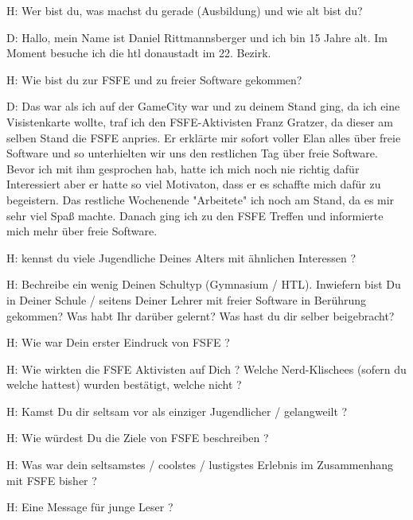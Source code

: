 H: Wer bist du, was machst du gerade (Ausbildung) und wie alt bist du?


D: Hallo, mein Name ist Daniel Rittmannsberger und ich bin 15 Jahre alt. Im Moment besuche ich die htl donaustadt im 22. Bezirk.





H: Wie bist du zur FSFE und zu freier Software gekommen?


D: Das war als ich auf der GameCity war und zu deinem Stand ging, da ich eine Visistenkarte wollte, traf ich den FSFE-Aktivisten
   Franz Gratzer, da dieser am selben Stand die FSFE anpries. Er erklärte mir sofort voller Elan alles über freie Software und so
   unterhielten wir uns den restlichen Tag über freie Software. Bevor ich mit ihm gesprochen hab, hatte ich mich noch nie
   richtig dafür Interessiert aber er hatte so viel Motivaton, dass er es schaffte mich dafür zu begeistern. Das restliche
   Wochenende "Arbeitete" ich noch am Stand, da es mir sehr viel Spaß machte. Danach ging ich zu den FSFE Treffen und
   informierte mich mehr über freie Software.





H: kennst du viele Jugendliche Deines Alters mit ähnlichen Interessen ?



H: Bechreibe ein wenig Deinen Schultyp (Gymnasium / HTL). Inwiefern bist Du in Deiner Schule / seitens Deiner Lehrer 
   mit freier Software in Berührung gekommen? Was habt Ihr darüber gelernt? Was hast du dir selber beigebracht?


H: Wie war Dein erster Eindruck von FSFE ?



H: Wie wirkten die FSFE Aktivisten auf Dich ? Welche Nerd-Klischees (sofern du welche hattest) wurden bestätigt, 
   welche nicht ?


H: Kamst Du dir seltsam vor als einziger Jugendlicher / gelangweilt ?


H: Wie würdest Du die Ziele von FSFE beschreiben ?


H: Was war dein seltsamstes / coolstes / lustigstes Erlebnis im Zusammenhang mit FSFE bisher ?


H: Eine Message für junge Leser ?


